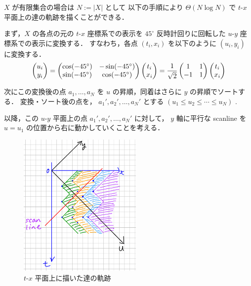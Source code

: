 $X$ が有限集合の場合は $N := |X|$ として
以下の手順により $\Theta(N \log N)$ で
$t$-$x$ 平面上の\server 達の軌跡を描くことができる．

まず，$X$ の各点の元の $t$-$x$ 座標系での表示を
$45^\circ$ 反時計回りに回転した $u$-$y$ 座標系での表示に変換する．
すなわち，各点 $(t_i, x_i)$ を以下のように $(u_i, y_i)$ に変換する．
\[
	\begin{pmatrix}
		u_i \\ y_i
	\end{pmatrix}
	=
	\begin{pmatrix}
		\cos(-45^\circ) & - \sin(-45^\circ) \\
		\sin(-45^\circ) &   \cos(-45^\circ)
	\end{pmatrix}
	\begin{pmatrix}
		t_i \\ x_i
	\end{pmatrix}
	=
	\frac{1}{\sqrt{2}}
	\begin{pmatrix}
		1  & 1 \\
		-1 & 1
	\end{pmatrix}
	\begin{pmatrix}
		t_i \\ x_i
	\end{pmatrix}
\]

次にこの変換後の点 $a_1, \ldots, a_N$ を $u$ の昇順，同着はさらに $y$ の昇順でソートする．
変換・ソート後の点を，
$a_1', a_2', \ldots, a_N'$ とする
 $( u_1 \leq u_2 \leq \cdots \leq u_N)$ .

以降，この $u$-$y$ 平面上の点 $a_1', a_2', \ldots, a_N'$ に対して，
$y$ 軸に平行な scanline を $u = u_1$ の位置から右に動かしていくことを考える．

\begin{figure}[H]
	\centering
	\includegraphics[width=6cm]{./figures/figure2.jpeg}
	\caption{$t$-$x$ 平面上に描いた\server 達の軌跡 \label{fig:uyspace}}
\end{figure}

